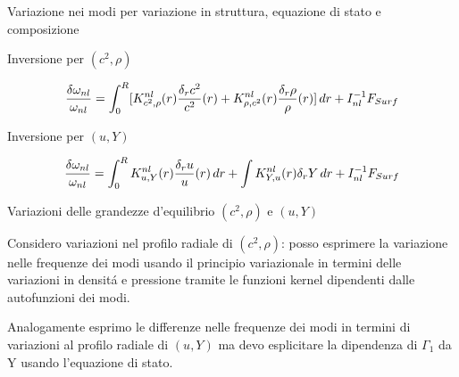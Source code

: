 \documentclass[10pt,xcolor={usenames},fleqn,mathserif,serif]{beamer}
\begin{document}
\begin{frame}{Variazione nei modi per variazione in struttura, equazione di stato e composizione}

\begin{block}{Inversione per $(c^2,\rho)$}

\begin{equation*}
\frac{\delta\omega_{nl}}{\omega_{nl}}=\int_0^R[K^{nl}_{c^2,\rho}(r)\frac{\delta_rc^2}{c^2}(r)+K^{nl}_{\rho,c^2}(r)\frac{\delta_r\rho}{\rho}(r)]\,dr+I_{nl}^{-1}F_{Surf}
\end{equation*}

\end{block}

\begin{block}{Inversione per $(u,Y)$}

\begin{equation*}
\frac{\delta\omega_{nl}}{\omega_{nl}}=\int_0^RK^{nl}_{u,Y}(r)\frac{\delta_ru}{u}(r)\,dr+\int K^{nl}_{Y,u}(r)\delta_rY\,dr+I_{nl}^{-1}F_{Surf}
\end{equation*}

\end{block}

\end{frame}

\begin{wordonframe}{Variazioni delle grandezze d'equilibrio $(c^2,\rho)$ e $(u,Y)$}

Considero variazioni nel profilo radiale di $(c^2,\rho)$: posso esprimere la variazione nelle frequenze dei modi usando il principio variazionale in termini delle variazioni in densit\'a e pressione tramite le funzioni kernel dipendenti dalle autofunzioni dei modi.

Analogamente  esprimo le differenze nelle frequenze dei modi in termini di variazioni al profilo radiale di $(u,Y)$ ma devo esplicitare la dipendenza di $\Gamma_1$ da Y usando l'equazione di stato.

\end{wordonframe}
\end{document}
